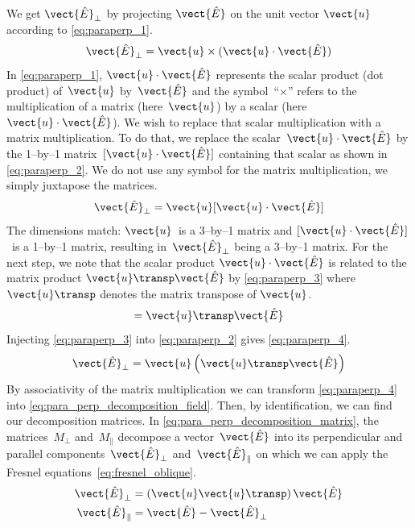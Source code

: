 We get $\vect{\hat{E}}_\perp$ by projecting $\vect{\hat{E}}$ on the unit vector $\vect{u}$ according to \cref{eq:paraperp_1}.
\begin{equation}
    \vect{\hat{E}}_\perp = \vect{u} \times (\vect{u} \cdot \vect{\hat{E}}) \label{eq:paraperp_1}
\end{equation}
In \cref{eq:paraperp_1}, $\vect{u} \cdot \vect{\hat{E}}$ represents the scalar product (dot product) of~$\vect{u}$ by~$\vect{\hat{E}}$ and the symbol~``$\times$'' refers to the multiplication of a matrix (here~$\vect{u}$) by a scalar (here~$\vect{u} \cdot \vect{\hat{E}}$).
We wish to replace that scalar multiplication with a matrix multiplication.
To do that, we replace the scalar~$\vect{u} \cdot \vect{\hat{E}}$ by the 1--by--1 matrix~$[\vect{u} \cdot \vect{\hat{E}}]$ containing that scalar as shown in \cref{eq:paraperp_2}.
We do not use any symbol for the matrix multiplication, we simply juxtapose the matrices.
\begin{equation}
    \vect{\hat{E}}_\perp = \vect{u} [\vect{u} \cdot \vect{\hat{E}}] \label{eq:paraperp_2}
\end{equation}
The dimensions match: $\vect{u}$~is a 3--by--1 matrix and $[\vect{u} \cdot \vect{\hat{E}}]$~is a 1--by--1 matrix, resulting in~$\vect{\hat{E}}_\perp$ being a 3--by--1 matrix.
For the next step, we note that the scalar product $\vect{u} \cdot \vect{\hat{E}}$ is related to the matrix product $\vect{u}\transp \vect{\hat{E}}$ by \cref{eq:paraperp_3} where $\vect{u}\transp$ denotes the matrix transpose of $\vect{u}$.
\begin{equation}
    [\vect{u} \cdot \vect{\hat{E}}] = \vect{u}\transp \vect{\hat{E}} \label{eq:paraperp_3}
\end{equation}
Injecting \cref{eq:paraperp_3} into \cref{eq:paraperp_2} gives \cref{eq:paraperp_4}.
\begin{equation}
    \vect{\hat{E}}_\perp = \vect{u} \left( \vect{u}\transp \vect{\hat{E}} \right) \label{eq:paraperp_4}
\end{equation}
By associativity of the matrix multiplication we can transform \cref{eq:paraperp_4} into \cref{eq:para_perp_decomposition_field}.
Then, by identification, we can find our decomposition matrices.
In \cref{eq:para_perp_decomposition_matrix}, the matrices~$M_\perp$ and~$M_\parallel$ decompose a vector~$\vect{\hat{E}}$ into its perpendicular and parallel components~$\vect{\hat{E}}_\perp$ and~$\vect{\hat{E}}_\parallel$ on which we can apply the Fresnel equations~\eqref{eq:fresnel_oblique}.
\begin{subequations}
    \begin{align}
        \vect{\hat{E}}_\perp &= \left(\vect{u} \vect{u}\transp \right) \vect{\hat{E}}
        \\
        \vect{\hat{E}}_\parallel &= \vect{\hat{E}} - \vect{\hat{E}}_\perp
    \end{align}
    \label{eq:para_perp_decomposition_field}
\end{subequations}
